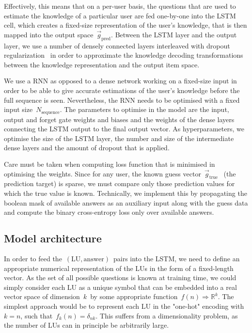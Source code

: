 Effectively, this means that on a per-user basis, the questions that are used to estimate the knowledge of a particular user are fed one-by-one into the LSTM cell, which creates a fixed-size representation of the user's knowledge, that is then mapped into the output space~$\vec{g}_\mathrm{pred}$. Between the LSTM layer and the output layer, we use a number of densely connected layers interleaved with dropout regularization~\cite{srivastava2014dropout} in order to approximate the knowledge decoding transformations between the knowledge representation and the output item space.

We use a RNN as opposed to a dense network working on a fixed-size input in order to be able to give accurate estimations of the user's knowledge before the full sequence is seen. Nevertheless, the RNN needs to be optimised with a fixed input size~$N_{\mathrm{sequence}}$. The parameters to optimise in the model are the input, output and forget gate weights and biases and the weights of the dense layers connecting the LSTM output to the final output vector. As hyperparameters, we optimise the size of the LSTM layer, the number and size of the intermediate dense layers and the amount of dropout that is applied.

Care must be taken when computing loss function that is minimised in optimising the weights. Since for any user, the known guess vector~$\vec{g}_\mathrm{true}$~ (the prediction target) is sparse, we must compare only those prediction values for which the true value is known. Technically, we implement this by propagating the boolean mask of available answers as an auxiliary input along with the guess data and compute the binary cross-entropy loss only over available answers.

\subsection{Model architecture}
\label{sec:nlp_model_architecture}
In order to feed the~$(\mathrm{LU}, \mathrm{answer})$~pairs into the LSTM, we need to define an appropriate numerical representation of the LUs in the form of a fixed-length vector. As the set of all possible questions is known at training time, we could simply consider each LU as a unique symbol that can be embedded into a real vector space of dimension~$k$~by some appropriate function~$f(n) \Rightarrow \mathbb{R}^k$. The simplest approach would be to represent each LU in the "one-hot" encoding with~$k=n$, such that~$f_k(n) = \delta_{nk}$. This suffers from a dimensionality problem, as the number of LUs can in principle be arbitrarily large.

